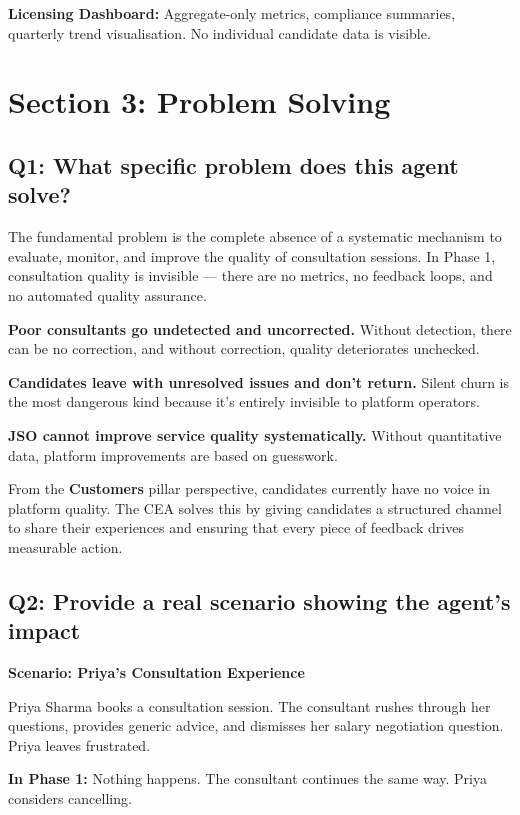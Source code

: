 \documentclass[11pt, a4paper]{article}
\begin{document}
\textbf{Licensing Dashboard:} Aggregate-only metrics, compliance summaries, quarterly trend visualisation. No individual candidate data is visible.

\section{Section 3: Problem Solving}

\subsection{Q1: What specific problem does this agent solve?}

The fundamental problem is the complete absence of a systematic mechanism to evaluate, monitor, and improve the quality of consultation sessions. In Phase 1, consultation quality is invisible — there are no metrics, no feedback loops, and no automated quality assurance.

\textbf{Poor consultants go undetected and uncorrected.} Without detection, there can be no correction, and without correction, quality deteriorates unchecked.

\textbf{Candidates leave with unresolved issues and don't return.} Silent churn is the most dangerous kind because it's entirely invisible to platform operators.

\textbf{JSO cannot improve service quality systematically.} Without quantitative data, platform improvements are based on guesswork.

From the \textbf{Customers} pillar perspective, candidates currently have no voice in platform quality. The CEA solves this by giving candidates a structured channel to share their experiences and ensuring that every piece of feedback drives measurable action.

\subsection{Q2: Provide a real scenario showing the agent's impact}

\textbf{Scenario: Priya's Consultation Experience}

Priya Sharma books a consultation session. The consultant rushes through her questions, provides generic advice, and dismisses her salary negotiation question. Priya leaves frustrated.

\textbf{In Phase 1:} Nothing happens. The consultant continues the same way. Priya considers cancelling.
\end{document}
